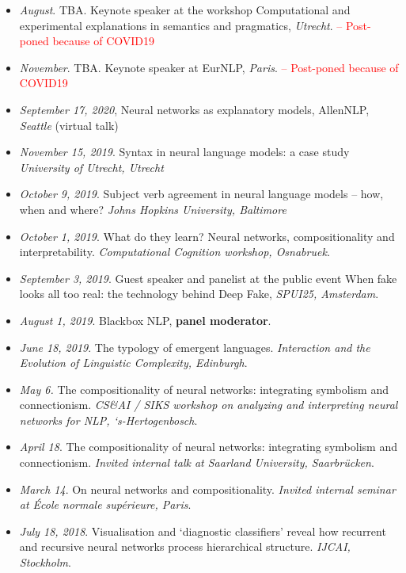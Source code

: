 \begin{itemize}
\setlength\itemsep{5pt}
    \item \textit{August}. TBA. Keynote speaker at the workshop Computational and experimental explanations in semantics and pragmatics, \textit{Utrecht}. \textcolor{red}{ -- Post-poned because of COVID19}
    \item \textit{November}. TBA. Keynote speaker at EurNLP, \textit{Paris}. \textcolor{red}{ -- Post-poned because of COVID19}
    \item \textit{September 17, 2020}, Neural networks as explanatory models, AllenNLP, \textit{Seattle} (virtual talk)
    \item \textit{November 15, 2019}. Syntax in neural language models: a case study \textit{University of Utrecht, Utrecht}
    \item \textit{October 9, 2019}. Subject verb agreement in neural language models -- how, when and where? \textit{Johns Hopkins University, Baltimore}
    \item \textit{October 1, 2019}. What do they learn? Neural networks, compositionality and interpretability. \textit{Computational Cognition workshop, Osnabruek}.
    \item \textit{September 3, 2019}. Guest speaker and panelist at the public event When fake looks all too real: the technology behind Deep Fake, \textit{SPUI25, Amsterdam}.
    \item \textit{August 1, 2019}. Blackbox NLP, \textbf{panel moderator}.
    \item \textit{June 18, 2019}. The typology of emergent languages. \textit{Interaction and the Evolution of Linguistic Complexity, Edinburgh}.
    \item \textit{May 6.} The compositionality of neural networks: integrating symbolism and connectionism. \textit{CS\&AI / SIKS workshop on analyzing and interpreting neural networks for NLP, ‘s-Hertogenbosch}.
    \item \textit{April 18}. The compositionality of neural networks: integrating symbolism and connectionism. \textit{Invited internal talk at Saarland University, Saarbrücken}.
    \item \textit{March 14}. On neural networks and compositionality. \textit{Invited internal seminar at École normale supérieure, Paris}.
    \item \textit{July 18, 2018}. Visualisation and ‘diagnostic classifiers’ reveal how recurrent and recursive neural networks process hierarchical structure. \textit{IJCAI, Stockholm}.

\end{itemize}
